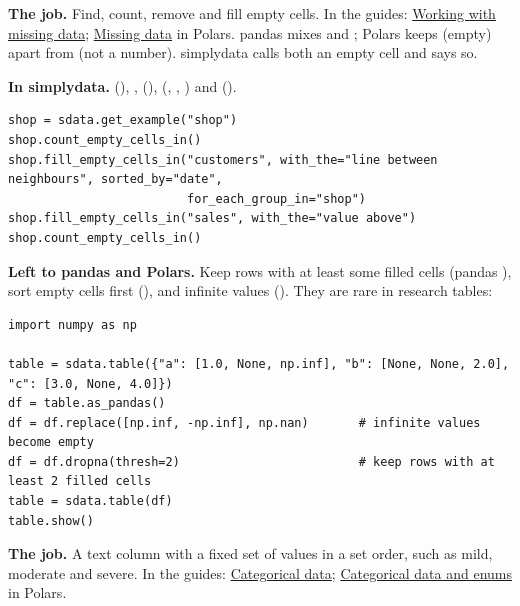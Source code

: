 
\textbf{The job.} Find, count, remove and fill empty cells. In the guides:
\href{https://pandas.pydata.org/docs/user_guide/missing_data.html}{Working with missing data};
\href{https://docs.pola.rs/user-guide/expressions/missing-data/}{Missing data} in Polars. pandas mixes
 and ; Polars keeps  (empty) apart from  (not a number).
simplydata calls both an empty cell and says so.

\textbf{In simplydata.}  (),
,  (),
 (, , ) and
 ().

\begin{lstlisting}[style=py]
shop = sdata.get_example("shop")
shop.count_empty_cells_in()
shop.fill_empty_cells_in("customers", with_the="line between neighbours", sorted_by="date",
                         for_each_group_in="shop")
shop.fill_empty_cells_in("sales", with_the="value above")
shop.count_empty_cells_in()
\end{lstlisting}

\textbf{Left to pandas and Polars.} Keep rows with at least some filled cells (pandas
), sort empty cells first (), and infinite values
(). They are rare in research tables:

\begin{lstlisting}[style=py]
import numpy as np

table = sdata.table({"a": [1.0, None, np.inf], "b": [None, None, 2.0], "c": [3.0, None, 4.0]})
df = table.as_pandas()
df = df.replace([np.inf, -np.inf], np.nan)       # infinite values become empty
df = df.dropna(thresh=2)                         # keep rows with at least 2 filled cells
table = sdata.table(df)
table.show()
\end{lstlisting}


\textbf{The job.} A text column with a fixed set of values in a set order, such as mild, moderate and
severe. In the guides: \href{https://pandas.pydata.org/docs/user_guide/categorical.html}{Categorical
data}; \href{https://docs.pola.rs/user-guide/expressions/categorical-data-and-enums/}{Categorical data
and enums} in Polars.

